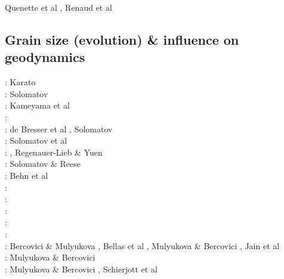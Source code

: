\begin{scriptsize}
Quenette et al \cite{quxm15}, Renaud et al \cite{revf19}
\end{scriptsize}

\subsection{Grain size (evolution) \& influence on geodynamics}
\label{sec:topics:gsev}

\begin{scriptsize}
\nineteeneightyfour: Karato \cite{kara84}\\
\nineteenninetysix: Solomatov \cite{solo96}\\
\nineteenninetyseven: Kameyama et al \cite{kayf97}\\
\nineteeneightynine: \cite{brcp99}\\
\twothousandone: de Bresser et al \cite{dets01}, Solomatov \cite{solo01}\\
\twothousandtwo: Solomatov et al \cite{soet02}\\
\twothousandthree: \cite{hapa03}, Regenauer-Lieb \& Yuen \cite{reyu03}\\
\twothousandeight: Solomatov \& Reese \cite{sore08}\\
\twothousandnine: Behn et al \cite{behe09}\\
\twothousandeleven: \cite{rorb11}\\
\twothousandthirteen: \cite{beri13}\\
\twothousandfourteen: \cite{besr14}\\
\twothousandfifteen: \cite{thrk15}\cite{tukb15}\cite{pevp15}\cite{glfa15}\\
\twothousandseventeen: \cite{ceww17}\cite{daef17}\cite{mube17}\cite{scdu17}\\
\twothousandeighteen: Bercovici \& Mulyukova \cite{bemu18}, Bellas et al \cite{bezb18},
                      Mulyukova \& Bercovici \cite{mube18}, Jain et al \cite{jakk18}\\
\twothousandnineteen: Mulyukova \& Bercovici \cite{mube19}\\
\twothousandtwenty: Mulyukova \& Bercovici \cite{mube20}, Schierjott et al \cite{scrt20}
\end{scriptsize}

